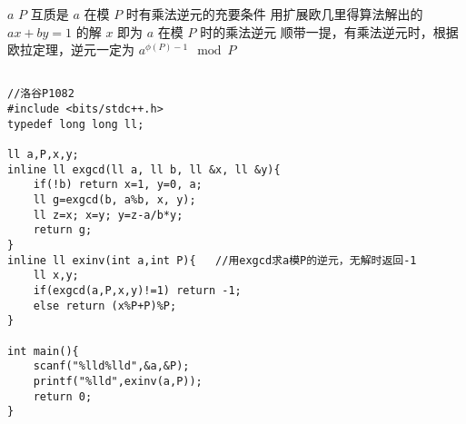 $a$ $P$ 互质是 $a$ 在模 $P$ 时有乘法逆元的充要条件
用扩展欧几里得算法解出的 $ax+by=1$ 的解 $x$ 即为 $a$ 在模 $P$ 时的乘法逆元
顺带一提，有乘法逆元时，根据欧拉定理，逆元一定为 $a^{\phi(P)-1} \mod P$

\begin{lstlisting}

//洛谷P1082
#include <bits/stdc++.h>
typedef long long ll;

ll a,P,x,y;
inline ll exgcd(ll a, ll b, ll &x, ll &y){
	if(!b) return x=1, y=0, a;
	ll g=exgcd(b, a%b, x, y);
	ll z=x; x=y; y=z-a/b*y;
	return g;
}
inline ll exinv(int a,int P){	//用exgcd求a模P的逆元，无解时返回-1
	ll x,y;
	if(exgcd(a,P,x,y)!=1) return -1;
	else return (x%P+P)%P;
}

int main(){
	scanf("%lld%lld",&a,&P);
	printf("%lld",exinv(a,P));
	return 0;
}

\end{lstlisting}